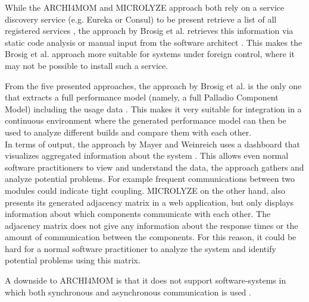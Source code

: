 While the ARCHI4MOM and MICROLYZE approach both rely on a service discovery service (e.g. Eureka or Consul) to be present retrieve a list of all registered services \cite{Singh2022ARCHI4MOM,Kleehaus2018}, the approach by Brosig et al. retrieves this information via static code analysis or manual input from the software architect \cite{Brosig2011}.
This makes the Brosig et al. approach more suitable for systems under foreign control, where it may not be possible to install such a service.

From the five presented approaches, the approach by Brosig et al. is the only one that extracts a full performance model (namely, a full Palladio Component Model) including the usage data \cite{Brosig2011}.
This makes it very suitable for integration in a continuous environment where the generated performance model can then be used to analyze different builds and compare them with each other.
\\

In terms of output, the approach by Mayer and Weinreich uses a dashboard that visualizes aggregated information about the system \cite{Mayer2018}.
This allows even normal software practitioners to view and understand the data, the approach gathers and analyze potential problems.
For example frequent communications between two modules could indicate tight coupling.
MICROLYZE on the other hand, also presents its generated adjacency matrix in a web application, but only displays information about which components communicate with each other.
The adjacency matrix does not give any information about the response times or the amount of communication between the components.
For this reason, it could be hard for a normal software practitioner to analyze the system and identify potential problems using this matrix.







A downside to ARCHI4MOM is that it does not support software-systems in which both synchronous and asynchronous communication is used \cite{Singh2022ARCHI4MOM}.




